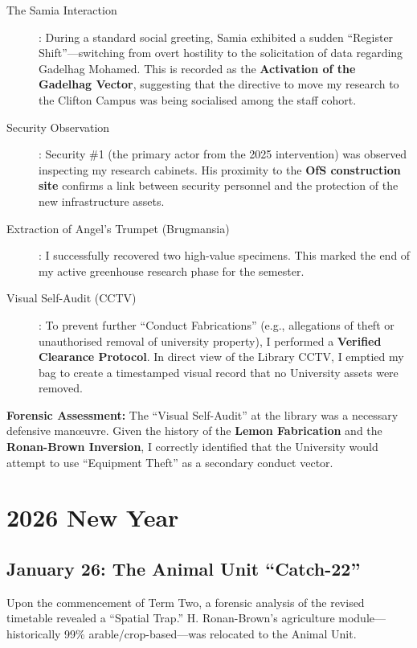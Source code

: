 \documentclass{EMBASSY}
\begin{document}
\begin{description}
	\item[The Samia Interaction]: During a standard social greeting, Samia exhibited a sudden ``Register Shift''---switching from overt hostility to the solicitation of data regarding Gadelhag Mohamed. This is recorded as the \textbf{Activation of the Gadelhag Vector}, suggesting that the directive to move my research to the Clifton Campus was being socialised among the staff cohort.
	\item[Security Observation]: Security \#1 (the primary actor from the 2025 intervention) was observed inspecting my research cabinets. His proximity to the \textbf{OfS construction site} confirms a link between security personnel and the protection of the new infrastructure assets.
	\item[Extraction of Angel’s Trumpet (Brugmansia)]: I successfully recovered two high-value specimens. This marked the end of my active greenhouse research phase for the semester.
	\item[Visual Self-Audit (CCTV)]: To prevent further ``Conduct Fabrications'' (e.g., allegations of theft or unauthorised removal of university property), I performed a \textbf{Verified Clearance Protocol}. In direct view of the Library CCTV, I emptied my bag to create a timestamped visual record that no University assets were removed.
\end{description}

\noindent\textbf{Forensic Assessment:} The ``Visual Self-Audit'' at the library was a necessary defensive man\oe uvre. Given the history of the \textbf{Lemon Fabrication} and the \textbf{Ronan-Brown Inversion}, I correctly identified that the University would attempt to use ``Equipment Theft'' as a secondary conduct vector.

\section{2026 New Year}

\subsection{January 26: The Animal Unit ``Catch-22''}
Upon the commencement of Term Two, a forensic analysis of the revised timetable revealed a ``Spatial Trap.'' H. Ronan-Brown’s agriculture module---historically 99\% arable/crop-based---was relocated to the Animal Unit.
\end{document}
